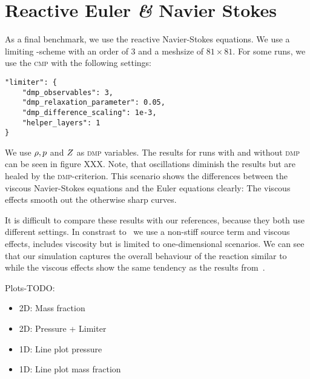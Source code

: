 \section{Reactive Euler \textit{\&} Navier Stokes}
As a final benchmark, we use the reactive Navier-Stokes equations.
We use a limiting \aderdg{}-scheme with an order of 3 and a meshsize of $81 \times 81$.
For some runs, we use the \textsc{cmp} with the following settings:
\begin{verbatim}
"limiter": {
    "dmp_observables": 3,
    "dmp_relaxation_parameter": 0.05,
    "dmp_difference_scaling": 1e-3,
    "helper_layers": 1
}
\end{verbatim}
We use $\rho, p$ and $Z$ as \textsc{dmp} variables.
The results for runs with and without \textsc{dmp} can be seen in figure XXX.
Note, that oscillations diminish the results but are healed by the \textsc{dmp}-criterion.
This scenario shows the differences between the viscous Navier-Stokes equations and the Euler equations clearly:
The viscous effects smooth out the otherwise sharp curves.

It is difficult to compare these results with our references, because they both use different settings.
In constrast to~\cite{helzel2000modified} we use a non-stiff source term and viscous effects, \cite{hidalgo2011ader} includes viscosity but is limited to one-dimensional scenarios.
We can see that our simulation captures the overall behaviour of the reaction similar to~\cite{helzel2000modified} while the viscous effects show the same tendency as the results from~\cite{hidalgo2011ader}.

Plots-TODO:
\begin{itemize}
\item 2D: Mass fraction
\item 2D: Pressure + Limiter
\item 1D: Line plot pressure
\item 1D: Line plot mass fraction
\end{itemize}


